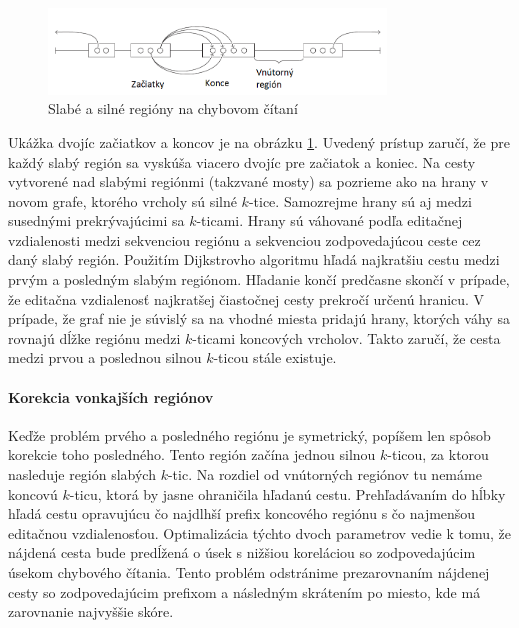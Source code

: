 \begin{figure}
    \centering
    \includegraphics[width=0.8\textwidth]{images/lordec.png}
    \caption{Slabé a silné regióny na chybovom čítaní}
    \label{fig:weakstrongregions}
\end{figure}
Ukážka dvojíc začiatkov a koncov je na obrázku \ref{fig:weakstrongregions}. Uvedený prístup zaručí, že pre každý slabý región sa vyskúša viacero dvojíc pre začiatok a koniec. Na cesty vytvorené nad slabými regiónmi (takzvané mosty) sa pozrieme ako na hrany v novom grafe, ktorého vrcholy sú silné $k$-tice. Samozrejme hrany sú aj medzi susednými prekrývajúcimi sa $k$-ticami. Hrany sú váhované podľa editačnej vzdialenosti medzi sekvenciou regiónu a sekvenciou zodpovedajúcou ceste cez daný slabý región. Použitím Dijkstrovho algoritmu hľadá najkratšiu cestu medzi prvým a posledným slabým regiónom. Hľadanie končí predčasne skončí v prípade, že editačna vzdialenosť najkratšej čiastočnej cesty prekročí určenú hranicu. V prípade, že graf nie je súvislý sa na vhodné miesta pridajú hrany, ktorých váhy sa rovnajú dĺžke regiónu medzi $k$-ticami koncových vrcholov. Takto zaručí, že cesta medzi prvou a poslednou silnou $k$-ticou stále existuje.

\paragraph{Korekcia vonkajších regiónov}

Keďže problém prvého a posledného regiónu je symetrický, popíšem len spôsob korekcie toho posledného. Tento región začína jednou silnou $k$-ticou, za ktorou nasleduje región slabých $k$-tic. Na rozdiel od vnútorných regiónov tu nemáme koncovú $k$-ticu, ktorá by jasne ohraničila hľadanú cestu. Prehľadávaním do hĺbky hľadá cestu opravujúcu čo najdlhší prefix koncového regiónu s čo najmenšou editačnou vzdialenosťou. Optimalizácia týchto dvoch parametrov vedie k tomu, že nájdená cesta bude predĺžená o úsek s nižšiou koreláciou so zodpovedajúcim úsekom chybového čítania. Tento problém odstránime prezarovnaním nájdenej cesty so zodpovedajúcim prefixom a následným skrátením po miesto, kde má zarovnanie najvyššie skóre.











